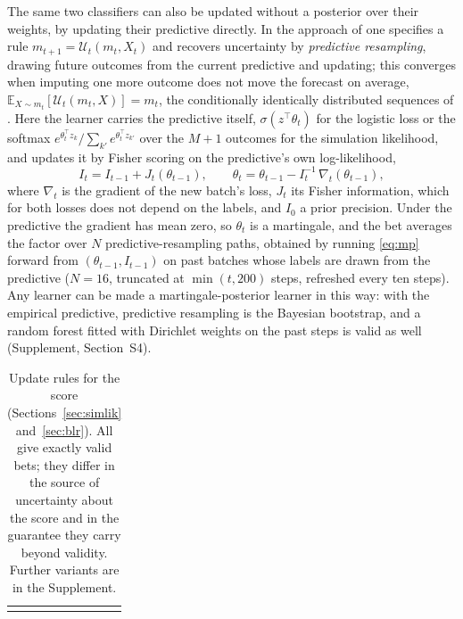 \documentclass[pdflatex,sn-mathphys-ay]{sn-jnl}
\newcommand{\E}{\mathbb{E}}
\theoremstyle{thmstyleone}
\theoremstyle{thmstyletwo}
\begin{document}
The same two classifiers can also be updated without a posterior over their
weights, by updating their predictive directly. In the approach of
\citet{fong2023martingale} one specifies a rule
$m_{t+1} = \mathcal U_t(m_t, X_t)$ and recovers uncertainty by
\emph{predictive resampling}, drawing future outcomes from the current
predictive and updating; this converges when imputing one more outcome does
not move the forecast on average, $\E_{X \sim m_t}[\mathcal U_t(m_t, X)] = m_t$,
the conditionally identically distributed sequences of \citet{berti2004limit}.
Here the learner carries the predictive itself, $\sigma(z^\top\theta_t)$ for
the logistic loss or the softmax $e^{\theta_t^\top z_k}/\sum_{k'} e^{\theta_t^\top z_{k'}}$
over the $M+1$ outcomes for the simulation likelihood, and updates it by
Fisher scoring on the predictive's own log-likelihood,
\begin{equation}\label{eq:mp}
I_t = I_{t-1} + J_t(\theta_{t-1}), \qquad
\theta_t = \theta_{t-1} - I_t^{-1}\, \nabla_t(\theta_{t-1}),
\end{equation}
where $\nabla_t$ is the gradient of the new batch's loss, $J_t$ its Fisher
information, which for both losses does not depend on the labels, and $I_0$ a
prior precision. Under the predictive the gradient has mean zero, so
$\theta_t$ is a martingale, and the bet averages the factor over $N$
predictive-resampling paths, obtained by running \eqref{eq:mp} forward from
$(\theta_{t-1}, I_{t-1})$ on past batches whose labels are drawn from the
predictive ($N = 16$, truncated at $\min(t, 200)$ steps, refreshed every ten
steps). Any learner can be made a martingale-posterior learner in this way:
with the empirical predictive, predictive resampling is the Bayesian
bootstrap, and a random forest fitted with Dirichlet weights on the past steps
is valid as well (Supplement, Section~S4).

%
\begin{table}[t]
\centering
\caption{Update rules for the score (Sections~\ref{sec:simlik}
and~\ref{sec:blr}). All give exactly valid bets; they differ in the source of
uncertainty about the score and in the guarantee they carry beyond validity.
Further variants are in the Supplement.}
\label{tab:rules}
\small
\begin{tabular}{@{}c@{}}\resizebox{\textwidth}{!}{\usebox{\widetab}}\end{tabular}
\end{table}
\end{document}
